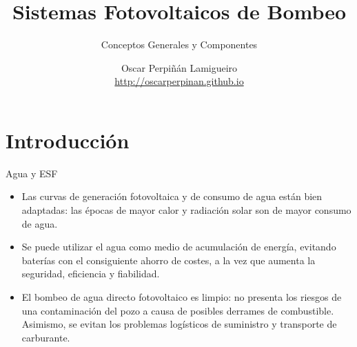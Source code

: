 \documentclass[xcolor={usenames,svgnames,dvipsnames}]{beamer}
\author{Oscar Perpiñán Lamigueiro \\ \url{http://oscarperpinan.github.io}}
\date{}
\title{Sistemas Fotovoltaicos de Bombeo}
\subtitle{Conceptos Generales y Componentes}
\begin{document}
\maketitle

\section{Introducción}
\label{sec:org5a4dd07}

\begin{frame}[label={sec:orge924322}]{Agua y ESF}
\begin{itemize}
\item Las \alert{curvas de generación fotovoltaica y de consumo de agua están bien adaptadas}: las épocas de mayor calor y radiación solar son de mayor consumo de agua.

\item Se puede utilizar el \alert{agua como medio de acumulación de energía}, evitando baterías con el consiguiente ahorro de costes, a la vez que aumenta la seguridad, eficiencia y fiabilidad.

\item El bombeo de agua directo fotovoltaico es limpio: \alert{no presenta los riesgos de una contaminación del pozo a causa de posibles derrames de combustible}. Asimismo, se evitan los problemas logísticos de suministro y transporte de carburante.
\end{itemize}
\end{frame}
\end{document}
